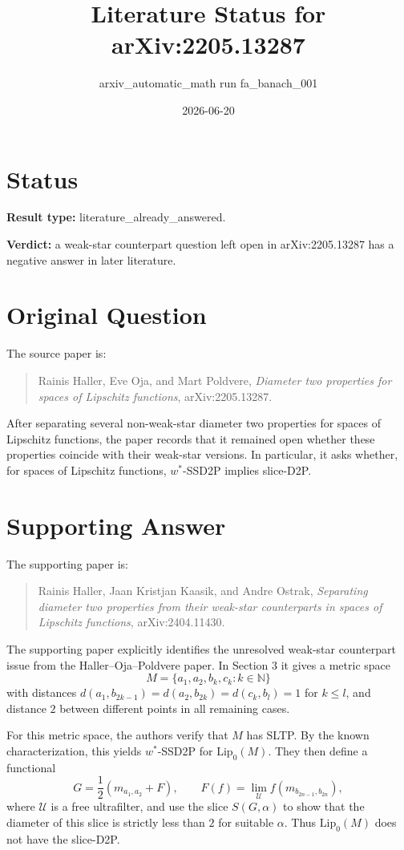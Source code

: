 \documentclass[11pt]{article}
\title{Literature Status for arXiv:2205.13287}
\author{arxiv\_automatic\_math run fa\_banach\_001}
\date{2026-06-20}
\begin{document}
\maketitle

\section*{Status}

\textbf{Result type:} literature\_already\_answered.

\textbf{Verdict:} a weak-star counterpart question left open in
arXiv:2205.13287 has a negative answer in later literature.

\section*{Original Question}

The source paper is:
\begin{quote}
Rainis Haller, Eve Oja, and Mart Poldvere,
\emph{Diameter two properties for spaces of Lipschitz functions},
arXiv:2205.13287.
\end{quote}

After separating several non-weak-star diameter two properties for spaces of
Lipschitz functions, the paper records that it remained open whether these
properties coincide with their weak-star versions. In particular, it asks
whether, for spaces of Lipschitz functions, \(w^\ast\)-SSD2P implies
slice-D2P.

\section*{Supporting Answer}

The supporting paper is:
\begin{quote}
Rainis Haller, Jaan Kristjan Kaasik, and Andre Ostrak,
\emph{Separating diameter two properties from their weak-star counterparts in
spaces of Lipschitz functions}, arXiv:2404.11430.
\end{quote}

The supporting paper explicitly identifies the unresolved weak-star
counterpart issue from the Haller--Oja--Poldvere paper. In Section 3 it gives
a metric space
\[
  M=\{a_1,a_2,b_k,c_k : k\in\mathbb N\}
\]
with distances \(d(a_1,b_{2k-1})=d(a_2,b_{2k})=d(c_k,b_l)=1\) for
\(k\leq l\), and distance \(2\) between different points in all remaining
cases.

For this metric space, the authors verify that \(M\) has SLTP. By the known
characterization, this yields \(w^\ast\)-SSD2P for \(\mathrm{Lip}_0(M)\).
They then define a functional
\[
  G=\frac12(m_{a_1,a_2}+F),
  \qquad
  F(f)=\lim_{\mathcal U} f(m_{b_{2n-1},b_{2n}}),
\]
where \(\mathcal U\) is a free ultrafilter, and use the slice
\(S(G,\alpha)\) to show that the diameter of this slice is strictly less
than \(2\) for suitable \(\alpha\). Thus \(\mathrm{Lip}_0(M)\) does not have
the slice-D2P.
\end{document}
